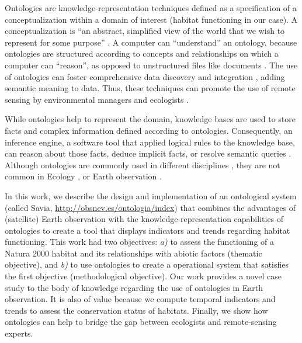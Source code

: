 Ontologies are knowledge-representation techniques defined as a specification of a conceptualization \autocite{Gruber1993TranslationApproach} within a domain of interest (habitat functioning in our case). A conceptualization is ``an abstract, simplified view of the world that we wish to represent for some purpose'' \autocite{Gruber1993TranslationApproach}. A computer can ``understand'' an ontology, because ontologies are structured according to concepts and relationships on which a computer can ``reason'', as opposed to unstructured files like documents \autocite{AntoniouVanHarmelen2004SemanticWeb}. The use of ontologies can foster comprehensive data discovery and integration \autocite{Gruber1993TranslationApproach,Jonesetal2006NewBioinformatics}, adding semantic meaning to data. Thus, these techniques can promote the use of remote sensing by environmental managers and ecologists \autocite{Silvaetal2005MiningPatterns}.

While ontologies help to represent the domain, knowledge bases are used to store facts and complex information defined according to ontologies. Consequently, an inference engine, a software tool that applied logical rules to the knowledge base, can reason about those facts, deduce implicit facts, or resolve semantic queries \autocite{HayesRothetal1983BuildingExpert}. Although ontologies are commonly used in different disciplines \autocite{BardRhee2004OntologiesBiology,RenearPalmer2009StrategicReading}, they are not common in Ecology \autocite{Madinetal2007OntologyDescribing,Madinetal2008AdvancingEcological,Williamsetal2006OntologiesEcoinformatics}, or Earth observation \autocite{Arvoretal2013AdvancesGeographic,Fallahietal2008OntologicalStructure,Hashimotoetal2011FrameworkOntologybased,FonsecaLlano2011AutomaticRepresentation,OlivaSantosetal2014OntologybasedTopological,WiegandGarcia2007TaskBasedOntology}.

In this work, we describe the design and implementation of an ontological system (called Savia, \url{http://obsnev.es/ontologia/index}) that combines the advantages of (satellite) Earth observation with the knowledge-representation capabilities of ontologies to create a tool that displays indicators and trends regarding habitat functioning. This work had two objectives: \emph{a)} to assess the functioning of a Natura 2000 habitat and its relationships with abiotic factors (thematic objective), and \emph{b)} to use ontologies to create a operational system that satisfies the first objective (methodological objective). Our work provides a novel case study to the body of knowledge regarding the use of ontologies in Earth observation. It is also of value because we compute temporal indicators and trends to assess the conservation status of habitats. Finally, we show how ontologies can help to bridge the gap between ecologists and remote-sensing experts.

